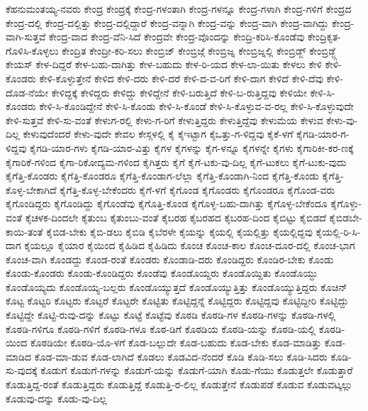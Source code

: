 {ಕೆಹನುಮಂತಯ್ಯ-ನವರು
ಕೇಂದ್ರ
ಕೇಂದ್ರಕ್ಕೆ
ಕೇಂದ್ರ-ಗಳಂತಾಗಿ
ಕೇಂದ್ರ-ಗಳನ್ನೂ
ಕೇಂದ್ರ-ಗಳಾಗಿ
ಕೇಂದ್ರ-ಗಳಿಗೆ
ಕೇಂದ್ರದ
ಕೇಂದ್ರ-ದಲ್ಲಿ
ಕೇಂದ್ರ-ದಲ್ಲಿತ್ತು
ಕೇಂದ್ರ-ದಲ್ಲಿದ್ದಾರೆ
ಕೇಂದ್ರ-ವನ್ನಾಗಿ
ಕೇಂದ್ರ-ವನ್ನು
ಕೇಂದ್ರ-ವಾಗಿ
ಕೇಂದ್ರ-ವಾಗಿದ್ದು
ಕೇಂದ್ರ-ವಾಗಿ-ಸುತ್ತವೆ
ಕೇಂದ್ರ-ವಾದ
ಕೇಂದ್ರ-ವೆನಿ-ಸಿದೆ
ಕೇಂದ್ರವೇ
ಕೇಂದ್ರ-ವೊಂದನ್ನು
ಕೇಂದ್ರಿ-ಕರಿಸಿ-ಕೊಂಡೆವು
ಕೇಂದ್ರಿಕೃತ-ಗೊಳಿಸಿ-ಕೊಳ್ಳಲು
ಕೇಂದ್ರಿತ
ಕೇಂದ್ರೀ-ಕರಿ-ಸಲು
ಕೇಂಬ್ರಿಜ್
ಕೇಂಬ್ರಿಜ್ಗೆ
ಕೇಂಬ್ರಿಜ್ನ
ಕೇಂಬ್ರಿಜ್ನಲ್ಲಿ
ಕೇಂಬ್ರಿಡ್ಜ್
ಕೇಂಬ್ರಿಡ್ಜ್ಗೆ
ಕೇಯಸ್
ಕೇಳ-ದಿದ್ದರೆ
ಕೇಳ-ಬಹು-ದಾಗಿತ್ತು
ಕೇಳ-ಬಹುದು
ಕೇಳ-ರಿ-ಯದ
ಕೇಳ-ಲಾ-ಯಿತು
ಕೇಳಲು
ಕೇಳಿ
ಕೇಳಿ-ಕೊಂಡರು
ಕೇಳಿ-ಕೊಳ್ಳುತ್ತೇನೆ
ಕೇಳಿದ
ಕೇಳಿ-ದರು
ಕೇಳಿ-ದರೆ
ಕೇಳಿ-ದ-ವ-ರಿಗೆ
ಕೇಳಿ-ದಾಗ
ಕೇಳಿದೆ
ಕೇಳಿ-ದೆವು
ಕೇಳಿ-ದೊಡ-ನೆಯೇ
ಕೇಳಿದ್ದಕ್ಕೆ
ಕೇಳಿದ್ದರು
ಕೇಳಿದ್ದು
ಕೇಳಿದ್ದೇನೆ
ಕೇಳಿ-ಬರುತ್ತಿದೆ
ಕೇಳಿ-ಬ-ರುತ್ತಿದ್ದವು
ಕೇಳಿಯೇ
ಕೇಳಿ-ಸಿ-ಕೊಂಡರು
ಕೇಳಿ-ಸಿ-ಕೊಂಡಿದ್ದೇನೆ
ಕೇಳಿ-ಸಿ-ಕೊಂಡು
ಕೇಳಿ-ಸಿ-ಕೊಂಡೆ
ಕೇಳಿ-ಸಿ-ಕೊಳ್ಳುವ-ವ-ರಲ್ಲ
ಕೇಳಿ-ಸಿ-ಕೊಳ್ಳುವುದೇ
ಕೇಳಿ-ಸುತ್ತವೆ
ಕೇಳಿ-ಸು-ವಂತೆ
ಕೇಳುಗ-ರಲ್ಲಿ
ಕೇಳು-ಗ-ರಿಗೆ
ಕೇಳುತ್ತಿದ್ದರು
ಕೇಳುತ್ತಿದ್ದೆವು
ಕೇಳುಮೆಯ
ಕೇಳುವ
ಕೇಳು-ವು-ದಿಲ್ಲ
ಕೇಳುವುದೆಂದರೆ
ಕೇಳು-ವುದೇ
ಕೇವಲ
ಕೇಸ್ಗಳಲ್ಲಿ
ಕೈ
ಕೈಇಟ್ಟಾಗ
ಕೈಒತ್ತು-ಗ-ಳಿದ್ದವು
ಕೈಕೆ-ಳಗೆ
ಕೈಗಡಿ-ಯಾರ-ಗ-ಳಿದ್ದವು
ಕೈಗಡಿ-ಯಾರ-ಗಳು
ಕೈಗಡಿ-ಯಾರ-ವಿತ್ತು
ಕೈಗಳ
ಕೈಗಳನ್ನು
ಕೈಗ-ಳನ್ನೂ
ಕೈಗಳನ್ನೇ
ಕೈಗಳು
ಕೈಗಾರಿಕೀ-ಕರ-ಣಕ್ಕೆ
ಕೈಗಾರಿಕೆ-ಗಳಿಂದ
ಕೈಗಾ-ರಿಕೋದ್ಯಮ-ಗಳಿಂದ
ಕೈಗಿತ್ತರು
ಕೈಗೆ
ಕೈಗೆ-ಟಕು-ವು-ದಿಲ್ಲ
ಕೈಗೆ-ಟುಕಲು
ಕೈಗೆ-ಟುಕು-ವುದು
ಕೈಗೆತ್ತಿ-ಕೊಂಡರು
ಕೈಗೆತ್ತಿ-ಕೊಂಡರೂ
ಕೈಗೆತ್ತಿ-ಕೊಂಡಾಗ-ಲೆಲ್ಲಾ
ಕೈಗೆತ್ತಿ-ಕೊಂಡಾಗಿ-ನಿಂದ
ಕೈಗೆತ್ತಿ-ಕೊಂಡು
ಕೈಗೆತ್ತಿ-ಕೊಳ್ಳ-ಬೇಕಾಗಿದೆ
ಕೈಗೆತ್ತಿ-ಕೊಳ್ಳ-ಬೇಕೆಂದರು
ಕೈಗೆ-ಳಗೆ
ಕೈಗೊಂಡ
ಕೈಗೊಂಡರು
ಕೈಗೊಂಡರೂ
ಕೈಗೊಂಡ-ವರು
ಕೈಗೊಂಡಿದ್ದರು
ಕೈಗೊಂಡಿದ್ದು
ಕೈಗೊಂಡೆವು
ಕೈಗೊತ್ತಿ-ಕೊಂಡ
ಕೈಗೊಳ್ಳ-ಬಹು-ದಾಗಿತ್ತು
ಕೈಗೊಳ್ಳ-ಬೇಕೆಂದೂ
ಕೈಗೊಳ್ಳು-ವಂತೆ
ಕೈಚಳಕ-ದಿಂದಲೇ
ಕೈತುಂಬ
ಕೈತುಂಬು-ವಂತೆ
ಕೈಬರಹ
ಕೈಬರಹದ
ಕೈಬರಹ-ದಿಂದ
ಕೈಬಿಟ್ಟು
ಕೈಬಿಡದೆ
ಕೈಬಿಡಬೇ-ಕಾಯಿ-ತಂತೆ
ಕೈಬಿಡ-ಬೇಕು
ಕೈಬಿ-ಡಲು
ಕೈಬಿಡಿ
ಕೈಬೆರಳೇ
ಕೈಯನ್ನು
ಕೈಯಲ್ಲಿ
ಕೈಯಲ್ಲಿತ್ತು
ಕೈಯಲ್ಲಿದ್ದವು
ಕೈಯಲ್ಲಿ-ರಿ-ಸಿ-ದಾಗ
ಕೈಯಲ್ಲೂ
ಕೈಯಾರ
ಕೈಯಿಂದ
ಕೈಹಿಡಿದ
ಕೈಹಿಡಿದು
ಕೊಂಚ
ಕೊಂಚ-ಕಾಲ
ಕೊಂಚ-ದೂರ-ದಲ್ಲಿ
ಕೊಂಚ-ಭಾಗ
ಕೊಂಚ-ವಾಗಿ
ಕೊಂಡದ್ದು
ಕೊಂಡ-ರಂತೆ
ಕೊಂಡರು
ಕೊಂಡಾಡಿ-ದರು
ಕೊಂಡಿದ್ದರು
ಕೊಂಡಿರ-ಬೇಕು
ಕೊಂಡು
ಕೊಂಡು-ಕೊಂಡರು
ಕೊಂಡು-ಕೊಂಡಿದ್ದರು
ಕೊಂಡೆವು
ಕೊಂಡೊಯ್ದರು
ಕೊಂಡೊಯ್ದಿತು
ಕೊಂಡೊಯ್ದು
ಕೊಂಡೊಯ್ಯದು
ಕೊಂಡೊಯ್ಯ-ಬಲ್ಲರು
ಕೊಂಡೊಯ್ಯುತ್ತದೆ
ಕೊಂಡೊಯ್ಯುತ್ತಿತ್ತು
ಕೊಂಡೊಯ್ಯುತ್ತಿದ್ದರು
ಕೊಚಿನ್
ಕೊಟ್ಟ
ಕೊಟ್ಟರಿ
ಕೊಟ್ಟರು
ಕೊಟ್ಟರೆ
ಕೊಟ್ಟರೇ
ಕೊಟ್ಟಿತು
ಕೊಟ್ಟಿದ್ದನ್ನೆ
ಕೊಟ್ಟಿದ್ದರು
ಕೊಟ್ಟಿದ್ದವು
ಕೊಟ್ಟಿದ್ದೀರಿ
ಕೊಟ್ಟಿದ್ದು
ಕೊಟ್ಟಿದ್ದೇ
ಕೊಟ್ಟಿ-ರುವು-ದನ್ನು
ಕೊಟ್ಟು
ಕೊಟ್ಟೆ
ಕೊಟ್ಟೆವು
ಕೊಠಡಿ
ಕೊಠಡಿ-ಗಳ
ಕೊಠಡಿ-ಗಳನ್ನು
ಕೊಠಡಿ-ಗಳಲ್ಲಿ
ಕೊಠಡಿ-ಗಳಿಗೂ
ಕೊಠಡಿ-ಗಳಿಗೆ
ಕೊಠಡಿ-ಗಳೂ
ಕೊಠ-ಡಿಗೆ
ಕೊಠಡಿಯ
ಕೊಠಡಿ-ಯನ್ನು
ಕೊಠಡಿ-ಯಲ್ಲಿ
ಕೊಠಡಿ-ಯಿಂದ
ಕೊಠಡಿಯೇ
ಕೊಠಡಿ-ಯೊ-ಳಗೆ
ಕೊಡ-ಬಲ್ಲುದೇ
ಕೊಡ-ಬಹುದು
ಕೊಡ-ಬೇಕು
ಕೊಡ-ಮಾಡಿತ್ತು
ಕೊಡ-ಮಾಡಿದ
ಕೊಡ-ಮಾ-ಡುವ
ಕೊಡ-ಲಾಗಿದೆ
ಕೊಡಲು
ಕೊಡವಿದ-ನೆಂದರೆ
ಕೊಡಿ
ಕೊಡಿ-ಸಲು
ಕೊಡಿ-ಸಿದರು
ಕೊಡಿ-ಸು-ವುದಕ್ಕೆ
ಕೊಡುಗೆ
ಕೊಡುಗೆ-ಗಳನ್ನು
ಕೊಡುಗೆ-ಯನ್ನು
ಕೊಡುಗೆ-ಯಾಗಿ
ಕೊಡು-ಗೆಯು
ಕೊಡುತ್ತಲೇ
ಕೊಡುತ್ತಾರೆ
ಕೊಡುತ್ತಿದ್ದ-ರಂತೆ
ಕೊಡುತ್ತಿದ್ದರು
ಕೊಡುತ್ತಿದ್ದೆ
ಕೊಡುತ್ತಿ-ರ-ಲಿಲ್ಲ
ಕೊಡುತ್ತೇನೆ
ಕೊಡುಪಡೆ
ಕೊಡುವ
ಕೊಡುವಟ್ಕಲ್ಲು
ಕೊಡುವು-ದನ್ನು
ಕೊಡು-ವು-ದಿಲ್ಲ
}
